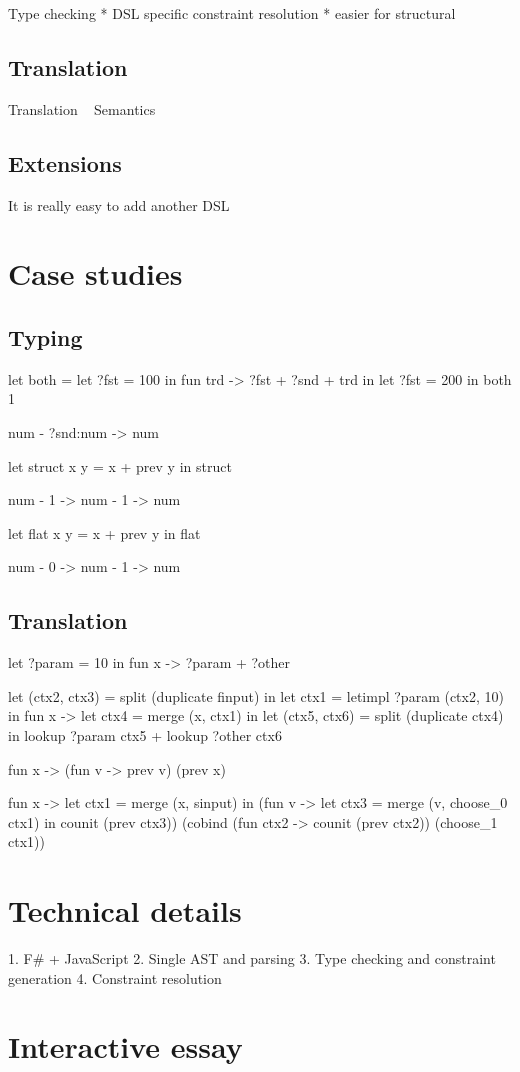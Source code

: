 Type checking
 * DSL specific constraint resolution
 * easier for structural


\subsection{Translation}
\label{sec:impl-theory-transl}

Translation ~ Semantics

\subsection{Extensions}
\label{sec:impl-theory-ext}

It is really easy to add another DSL

\section{Case studies}
\label{sec:impl-case}

\subsection{Typing}
\label{sec:impl-case-typing}

let both =
  let ?fst = 100 in
  fun trd -> ?fst + ?snd + trd in
let ?fst = 200 in
both 1

num -{ ?snd:num }-> num


let struct x y = x + prev y in
struct

num -{ 1 }-> num -{ 1 }-> num

let flat x y = x + prev y in
flat

num -{ 0 }-> num -{ 1 }-> num

\subsection{Translation}
\label{sec:impl-case-transl}

let ?param = 10 in
fun x -> ?param + ?other

let (ctx2, ctx3) = split (duplicate finput) in
let ctx1 = letimpl ?param (ctx2, 10) in
fun x ->
  let ctx4 = merge (x, ctx1) in
  let (ctx5, ctx6) = split (duplicate ctx4) in
  lookup ?param ctx5 + lookup ?other ctx6


fun x -> (fun v -> prev v) (prev x)

fun x ->
  let ctx1 = merge (x, sinput) in
  (fun v ->
    let ctx3 = merge (v, choose_0 ctx1) in
    counit (prev ctx3)) (cobind (fun ctx2 ->
      counit (prev ctx2)) (choose_1 ctx1))

\section{Technical details}
\label{sec:impl-tech}

1. F# + JavaScript
2. Single AST and parsing
3. Type checking and constraint generation
4. Constraint resolution

\section{Interactive essay}
\label{sec:impl-essay}
